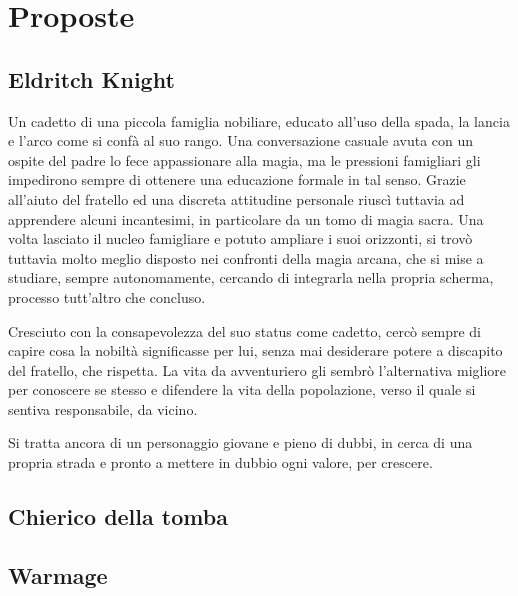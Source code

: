 \documentclass[letterpaper,10pt,twoside,twocolumn,openany]{dndbook}
\begin{document}
\section{Proposte}
\subsection{Eldritch Knight}

Un cadetto di una piccola famiglia nobiliare, educato all'uso della spada, la lancia e l'arco come si confà al suo rango. Una conversazione casuale avuta con un ospite del padre lo fece appassionare alla magia, ma le pressioni famigliari gli impedirono sempre di ottenere una educazione formale in tal senso.
Grazie all'aiuto del fratello ed una discreta attitudine personale riuscì tuttavia ad apprendere alcuni incantesimi, in particolare da un tomo di magia sacra.
Una volta lasciato il nucleo famigliare e potuto ampliare i suoi orizzonti, si trovò tuttavia molto meglio disposto nei confronti della magia arcana, che si mise a studiare, sempre autonomamente, cercando di integrarla nella propria scherma, processo tutt'altro che concluso.

Cresciuto con la consapevolezza del suo status come cadetto, cercò sempre di capire cosa la nobiltà significasse per lui, senza mai desiderare potere a discapito del fratello, che rispetta. La vita da avventuriero gli sembrò l'alternativa migliore per conoscere se stesso e difendere la vita della popolazione, verso il quale si sentiva responsabile, da vicino.

Si tratta ancora di un personaggio giovane e pieno di dubbi, in cerca di una propria strada e pronto a mettere in dubbio ogni valore, per crescere.




\subsection{Chierico della tomba}

\subsection{Warmage}
\end{document}
